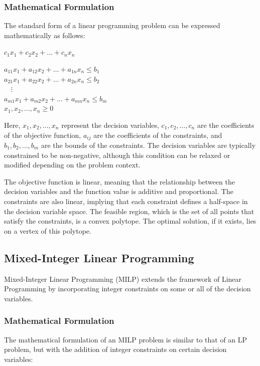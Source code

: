 \documentclass [version=final]{iacrcc}
\begin{document}
\subsubsection{Mathematical Formulation}
The standard form of a linear programming problem can be expressed mathematically as follows:

\begin{center}
    $c_1x_1 + c_2x_2 + \dots + c_nx_n $
\end{center}
\begin{center}
    $  a_{11}x_1 + a_{12}x_2 + \dots + a_{1n}x_n \leq b_1 $ \\
    $ a_{21}x_1 + a_{22}x_2 + \dots + a_{2n}x_n \leq b_2 $ \\
    $ \quad \vdots $ \\
    $ a_{m1}x_1 + a_{m2}x_2 + \dots + a_{mn}x_n \leq b_m $ \\
    $ x_{1}, x_{2}, \dots, x_n \geq 0 $
\end{center}

Here, $ x_1, x_2, \dots, x_n $ represent the decision variables, $ c_1, c_2, \dots, c_n $ are the coefficients of the objective function, $ a_{ij} $ are the coefficients of the constraints, and $ b_1, b_2, \dots, b_m $ are the bounds of the constraints. The decision variables are typically constrained to be non-negative, although this condition can be relaxed or modified depending on the problem context.

The objective function is linear, meaning that the relationship between the decision variables and the function value is additive and proportional. The constraints are also linear, implying that each constraint defines a half-space in the decision variable space. The feasible region, which is the set of all points that satisfy the constraints, is a convex polytope. The optimal solution, if it exists, lies on a vertex of this polytope.


\subsection{Mixed-Integer Linear Programming}
Mixed-Integer Linear Programming (MILP) extends the framework of Linear Programming by incorporating integer constraints on some or all of the decision variables. 

\subsubsection{Mathematical Formulation}
The mathematical formulation of an MILP problem is similar to that of an LP problem, but with the addition of integer constraints on certain decision variables:
\end{document}

